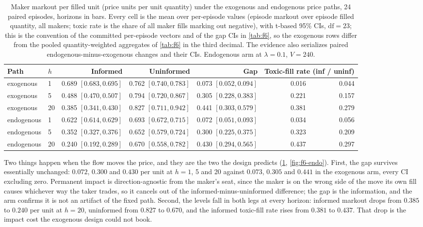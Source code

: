 \begin{table}[t]
\centering
\caption{Maker markout per filled unit (price units per unit quantity) under the exogenous and endogenous price paths, 24 paired episodes, horizons in bars. Every cell is the mean over per-episode values (episode markout over episode filled quantity, all makers; toxic rate is the share of all maker fills marking out negative), with t-based 95\% CIs, $\mathrm{df}=23$; this is the convention of the committed per-episode vectors and of the gap CIs in \cref{tab:f6}, so the exogenous rows differ from the pooled quantity-weighted aggregates of \cref{tab:f6} in the third decimal. The evidence also serializes paired endogenous-minus-exogenous changes and their CIs. Endogenous arm at $\lambda = 0.1$, $V = 240$.}
\label{tab:f6-endo}
\footnotesize
\setlength{\tabcolsep}{3.5pt}
\begin{tabular}{llrrrrr}
\toprule
Path & $h$ & Informed & Uninformed & Gap & \multicolumn{2}{c}{Toxic-fill rate (inf / uninf)} \\
\midrule
exogenous  & 1  & 0.689 $[0.683, 0.695]$ & 0.762 $[0.740, 0.783]$ & 0.073 $[0.052, 0.094]$ & 0.016 & 0.044 \\
exogenous  & 5  & 0.488 $[0.470, 0.507]$ & 0.794 $[0.720, 0.867]$ & 0.305 $[0.228, 0.383]$ & 0.221 & 0.157 \\
exogenous  & 20 & 0.385 $[0.341, 0.430]$ & 0.827 $[0.711, 0.942]$ & 0.441 $[0.303, 0.579]$ & 0.381 & 0.279 \\
\midrule
endogenous & 1  & 0.622 $[0.614, 0.629]$ & 0.693 $[0.672, 0.715]$ & 0.072 $[0.051, 0.093]$ & 0.034 & 0.056 \\
endogenous & 5  & 0.352 $[0.327, 0.376]$ & 0.652 $[0.579, 0.724]$ & 0.300 $[0.225, 0.375]$ & 0.323 & 0.209 \\
endogenous & 20 & 0.240 $[0.192, 0.289]$ & 0.670 $[0.558, 0.782]$ & 0.430 $[0.294, 0.565]$ & 0.437 & 0.297 \\
\bottomrule
\end{tabular}
\end{table}

Two things happen when the flow moves the price, and they are the two the design predicts (\cref{tab:f6-endo}, \cref{fig:f6-endo}). First, the gap survives essentially unchanged: $0.072$, $0.300$ and $0.430$ per unit at $h = 1$, 5 and 20 against $0.073$, $0.305$ and $0.441$ in the exogenous arm, every CI excluding zero. Permanent impact is direction-agnostic from the maker's seat, since the maker is on the wrong side of the move its own fill causes whichever way the taker trades, so it cancels out of the informed-minus-uninformed difference; the gap is the information, and the arm confirms it is not an artifact of the fixed path. Second, the levels fall in both legs at every horizon: informed markout drops from $0.385$ to $0.240$ per unit at $h = 20$, uninformed from $0.827$ to $0.670$, and the informed toxic-fill rate rises from $0.381$ to $0.437$. That drop is the impact cost the exogenous design could not book.

